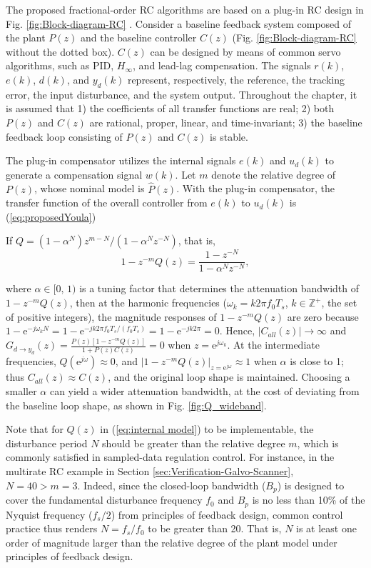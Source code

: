 \documentclass [11pt, proquest] {uwthesis}[2020/02/24]
\begin{document}
The proposed fractional-order RC algorithms are based on a plug-in
RC design in Fig. \ref{fig:Block-diagram-RC} \cite{XuChen_TCST_RC2013}.
Consider a baseline feedback system composed of the plant $P(z)$
and the baseline controller $C(z)$ (Fig. \ref{fig:Block-diagram-RC}
without the dotted box). $C(z)$ can be designed by means of common
servo algorithms, such as PID, $H_{\infty}$, and lead-lag compensation.
The signals $r(k)$, $e(k)$, $d(k)$, and $y_{d}(k)$ represent,
respectively, the reference, the tracking error, the input disturbance,
and the system output. Throughout the chapter, it is assumed that 1)
the coefficients of all transfer functions are real; 2) both $P(z)$
and $C(z)$ are rational, proper, linear, and time-invariant; 3) the
baseline feedback loop consisting of $P(z)$ and $C(z)$ is stable.

The plug-in compensator utilizes the internal signals $e(k)$ and
$u_{d}(k)$ to generate a compensation signal $w(k)$. Let $m$ denote
the relative degree of $P(z)$, whose nominal model is $\hat{P}(z)$.
With the plug-in compensator, the transfer function of the overall
controller from $e(k)$ to $u_{d}(k)$ is (\ref{eq:proposedYoula})

If $Q=(1-\alpha^{N})z^{m-N}/(1-\alpha^{N}z^{-N})$, that is,
\begin{equation}
1-z^{-m}Q(z)=\frac{1-z^{-N}}{1-\alpha^{N}z^{-N}},\label{eq:internal model}
\end{equation}

\noindent where $\alpha\in[0,\,1)$ is a tuning factor that determines
the attenuation bandwidth of $1-z^{-m}Q(z)$, then at the harmonic
frequencies ($\omega_{k}=k2\pi f_{0}T_{s}$, $k\in\mathbb{Z}^{+}$,
the set of positive integers), the magnitude responses of $1-z^{-m}Q(z)$
are zero because $1-\text{e}^{-j\omega_{k}N}=1-\text{e}^{-jk2\pi f_{0}T_{s}/(f_{0}T_{s})}=1-\text{e}^{-jk2\pi}=0$.
Hence, $|C_{all}(z)|\rightarrow\infty$ and $G_{d\rightarrow y_{d}}(z)=\frac{P(z)[1-z^{-m}Q(z)]}{1+P(z)C(z)}=0$
when $z=\text{e}^{j\omega_{k}}$. At the intermediate frequencies,
$Q(\text{e}^{j\omega})\approx0$, and $|1-z^{-m}Q(z)|_{z=\text{e}^{j\omega}}\approx1$
when $\alpha$ is close to 1; thus $C_{all}(z)\approx C(z)$, and
the original loop shape is maintained. Choosing a smaller $\alpha$
can yield a wider attenuation bandwidth, at the cost of deviating
from the baseline loop shape, as shown in Fig. \ref{fig:Q_wideband}.

Note that for $Q(z)$ in (\ref{eq:internal model}) to be implementable,
the disturbance period $N$ should be greater than the relative degree
$m$, which is commonly satisfied in sampled-data regulation control.
For instance, in the multirate RC example in Section \ref{sec:Verification-Galvo-Scanner},
$N=40>m=3$. Indeed, since the closed-loop bandwidth ($B_{p}$) is
designed to cover the fundamental disturbance frequency $f_{0}$ and
$B_{p}$ is no less than 10\% of the Nyquist frequency ($f_{s}/2$)
from principles of feedback design, common control practice thus renders
$N=f_{s}/f_{0}$ to be greater than 20. That is, $N$ is at least
one order of magnitude larger than the relative degree of the plant
model under principles of feedback design.
\end{document}
